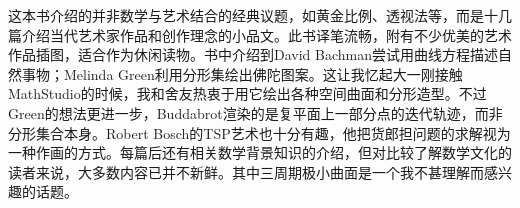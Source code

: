 \par 这本书介绍的并非数学与艺术结合的经典议题，如黄金比例、透视法等，而是十几篇介绍当代艺术家作品和创作理念的小品文。此书译笔流畅，附有不少优美的艺术作品插图，适合作为休闲读物。书中介绍到David Bachman尝试用曲线方程描述自然事物；Melinda Green利用分形集绘出佛陀图案。这让我忆起大一刚接触MathStudio的时候，我和舍友热衷于用它绘出各种空间曲面和分形造型。不过Green的想法更进一步，Buddabrot渲染的是复平面上一部分点的迭代轨迹，而非分形集合本身。Robert Bosch的TSP艺术也十分有趣，他把货郎担问题的求解视为一种作画的方式。每篇后还有相关数学背景知识的介绍，但对比较了解数学文化的读者来说，大多数内容已并不新鲜。其中三周期极小曲面是一个我不甚理解而感兴趣的话题。
\par {}

